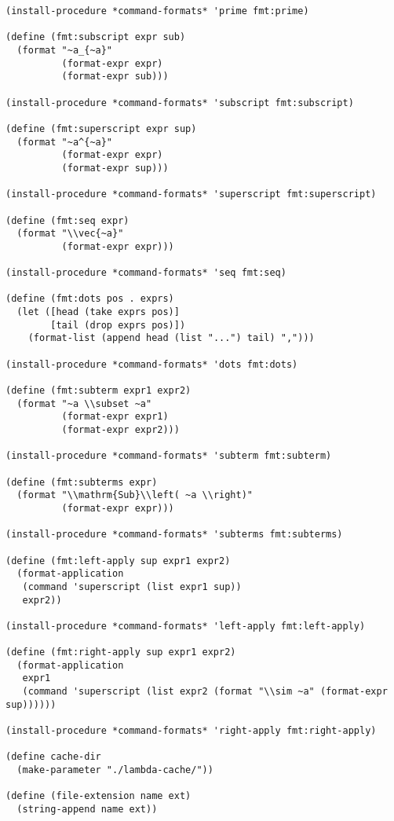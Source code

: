 \begin{lstlisting}[language=racket]
(install-procedure *command-formats* 'prime fmt:prime)

(define (fmt:subscript expr sub)
  (format "~a_{~a}"
          (format-expr expr)
          (format-expr sub)))

(install-procedure *command-formats* 'subscript fmt:subscript)

(define (fmt:superscript expr sup)
  (format "~a^{~a}"
          (format-expr expr)
          (format-expr sup)))

(install-procedure *command-formats* 'superscript fmt:superscript)

(define (fmt:seq expr)
  (format "\\vec{~a}"
          (format-expr expr)))

(install-procedure *command-formats* 'seq fmt:seq)

(define (fmt:dots pos . exprs)
  (let ([head (take exprs pos)]
        [tail (drop exprs pos)])
    (format-list (append head (list "...") tail) ",")))

(install-procedure *command-formats* 'dots fmt:dots)

(define (fmt:subterm expr1 expr2)
  (format "~a \\subset ~a"
          (format-expr expr1)
          (format-expr expr2)))

(install-procedure *command-formats* 'subterm fmt:subterm)

(define (fmt:subterms expr)
  (format "\\mathrm{Sub}\\left( ~a \\right)"
          (format-expr expr)))

(install-procedure *command-formats* 'subterms fmt:subterms)

(define (fmt:left-apply sup expr1 expr2)
  (format-application
   (command 'superscript (list expr1 sup))
   expr2))

(install-procedure *command-formats* 'left-apply fmt:left-apply)

(define (fmt:right-apply sup expr1 expr2)
  (format-application
   expr1
   (command 'superscript (list expr2 (format "\\sim ~a" (format-expr sup))))))

(install-procedure *command-formats* 'right-apply fmt:right-apply)

(define cache-dir
  (make-parameter "./lambda-cache/"))

(define (file-extension name ext)
  (string-append name ext))


\end{lstlisting}

